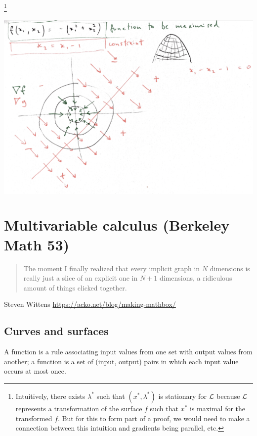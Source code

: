 \footnote{Intuitively, there exists $\lambda^*$ such that $(x^*, \lambda^*)$ is stationary for
  $\mathcal{L}$ because $\mathcal{L}$ represents a transformation of the surface $f$ such that $x^*$ is maximal for
  the transformed $f$. But for this to form part of a proof, we would need to make a connection
  between this intuition and gradients being parallel, etc.}

\begin{mdframed}
\includegraphics[width=400pt]{img/lagrange-multiplier-diag-1.png}
\end{mdframed}

\section{Multivariable calculus (Berkeley Math 53)}

\begin{quote}
  The moment I finally realized that every implicit graph in $N$ dimensions is really just a slice of
  an explicit one in $N+1$ dimensions, a ridiculous amount of things clicked together.
\end{quote}
Steven Wittens \url{https://acko.net/blog/making-mathbox/}

\subsection{Curves and surfaces}

A function is a rule associating input values from one set with output values
from another; a function is a set of (input, output) pairs in which each input
value occurs at most once.

